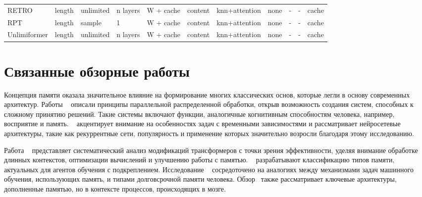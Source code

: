\begin{table}[ht]
\begin{tabular}{lllllllllll}
           RETRO &    length & unlimited & n layers &    W + cache &      content &    knn+attention &                   none &                 - &              - &                    cache \\
             RPT &    length &    sample &        1 &    W + cache &      content &    knn+attention &                   none &                 - &              - &                    cache \\
    Unlimiformer &    length & unlimited & n layers &    W + cache &      content &    knn+attention &                   none &                 - &              - &                    cache \\
\bottomrule
\end{tabular}

\end{table}

\section{Связанные обзорные работы}

Концепция памяти оказала значительное влияние на формирование многих классических основ, которые легли в основу современных архитектур. Работы ~\cite{rumelhart1986parallel, mcclelland1987parallel} описали принципы параллельной распределенной обработки, открыв возможность создания систем, способных к сложному принятию решений. Такие системы включают функции, аналогичные когнитивным способностям человека, например, восприятие и память. ~\cite{elman1990finding} акцентирует внимание на особенностях задач с временными зависимостями и рассматривает нейросетевые архитектуры, такие как рекуррентные сети, популярность и применение которых значительно возросли благодаря этому исследованию.

Работа ~\cite{tay2020efficient} представляет систематический анализ модификаций трансформеров с точки зрения эффективности, уделяя внимание обработке длинных контекстов, оптимизации вычислений и улучшению работы с памятью. ~\cite{cherepanov2024unraveling} разрабатывают классификацию типов памяти, актуальных для агентов обучения с подкреплением. Исследование ~\cite{he2024human} сосредоточено на аналогиях между механизмами задач машинного обучения, использующих память, и типами долговсрочной памяти человека. Обзор~\cite{khosla2023survey} также рассматривает ключевые архитектуры, дополненные памятью, но в контексте процессов, происходящих в мозге.